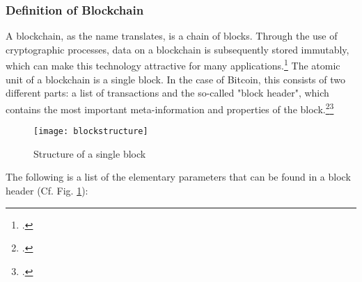 \subsubsection{Definition of Blockchain} \label{toc:kryptowaehrungenundblockchain}

A blockchain, as the name translates, is a chain of blocks. Through the use of cryptographic
processes, data on a blockchain is subsequently stored immutably, which can make this technology attractive for many
applications.\footcite[Cf.][p. 1]{friedlmaier2018disrupting} The atomic unit of a blockchain
is a single block. In the case of Bitcoin, this consists of two different parts: a list of transactions
and the so-called "block header", which contains the most important meta-information and properties of the block.\footcite[Cf.][p. 48]{bhaskar2015bitcoin}\footcite[Cf.][p. 4]{nakamoto2008bitcoin}

\begin{figure}[H]
    \caption{Structure of a single block}
    \texttt{[image: blockstructure]}
    \label{figure:blockstructure}
    \\
    \cite[Source: Based on][p. 4]{nakamoto2008bitcoin}
\end{figure}

The following is a list of the elementary parameters that can be found in a block header
(Cf. Fig. \ref{figure:blockstructure}):

